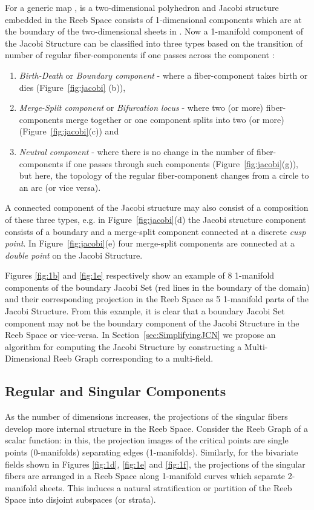 \documentclass[twocolumn]{article}
\newcommand{\twofigref}[2]{Figures \ref{fig:#1} and \ref{fig:#2}}
\newcommand{\threefigref}[3]{Figures \ref{fig:#1}, \ref{fig:#2} and \ref{fig:#3}}
\begin{document}
For a generic map ,  is a two-dimensional
polyhedron and Jacobi structure embedded in the Reeb Space consists of
1-dimensional components which are at the boundary of the
two-dimensional sheets in .
Now a 1-manifold component of the Jacobi Structure can be classified into three types
based on  the transition of number of regular fiber-components if one
passes across the component \cite{Saeki2014}:

\begin{enumerate}
\item \emph{Birth-Death} or \emph{Boundary component} - where a fiber-component takes
birth or dies (Figure~\ref{fig:jacobi} (b)), 
\item \emph{Merge-Split component} or \emph{Bifurcation locus} - where
  two (or more) fiber-components merge together or one component splits into two (or more) (Figure~\ref{fig:jacobi}(c))
and 
\item \emph{Neutral component} - where there is no
change in the number of fiber-components if one passes through such
components (Figure~\ref{fig:jacobi}(g)), but here, the topology of the regular fiber-component changes from a circle to an arc (or vice versa).
\end{enumerate}
A connected component of the Jacobi structure may also consist of a composition of these
three types, e.g. in Figure~\ref{fig:jacobi}(d) the Jacobi structure
component consists of a boundary and a merge-split
component connected at a discrete \emph{cusp point}. In
Figure~\ref{fig:jacobi}(e) four merge-split components are connected
at a \emph{double point} on the Jacobi Structure.

\twofigref{1b}{1e} respectively show an example of 8 1-manifold components
of the boundary Jacobi Set (red lines in the boundary of the domain) and their
corresponding projection in the Reeb Space as 5 1-manifold parts of
the  Jacobi Structure. From this example, it is clear
that a boundary Jacobi Set component may not be the boundary
component of the Jacobi Structure in the Reeb Space or vice-versa. 
In Section~\ref{sec:SimplifyingJCN} we propose an algorithm for computing the Jacobi Structure
by constructing a Multi-Dimensional Reeb Graph corresponding to a multi-field.

\subsection{Regular and Singular Components}
As the number of dimensions increases, the projections of the singular fibers
develop more internal structure in the Reeb Space.
Consider the Reeb Graph of a scalar function: in this, the projection
images of the critical points are single points (0-manifolds)
separating edges (1-manifolds). Similarly, for the bivariate fields
shown in \threefigref{1d}{1e}{1f}, the projections of the
singular fibers are arranged in a Reeb Space along 1-manifold curves which separate 2-manifold sheets.
This induces a natural stratification or partition of the Reeb Space
into disjoint subspaces (or strata).
\end{document}
